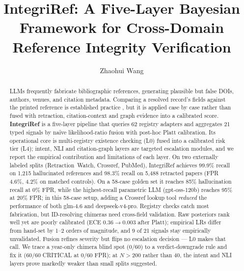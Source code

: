 \documentclass[runningheads]{llncs}
\begin{document}
\title{IntegriRef: A Five-Layer Bayesian Framework for Cross-Domain Reference Integrity Verification}

\author{Zhaohui Wang}

\maketitle

\begin{abstract}
LLMs frequently fabricate bibliographic references, generating plausible but false DOIs, authors, venues, and citation metadata. Comparing a resolved record's fields against the printed reference is established practice \cite{dunford2024bibliography}, but it is applied case by case rather than fused with retraction, citation-context and graph evidence into a calibrated score.
\textbf{IntegriRef} is a five-layer pipeline that queries 62 registry adapters and aggregates 21 typed signals by na\"ive likelihood-ratio fusion with post-hoc Platt calibration. Its operational core is multi-registry existence checking (L0) fused into a calibrated risk tier (L4); intent, NLI and citation-graph layers are targeted escalation modules, and we report the empirical contribution and limitations of each layer. On two externally labeled splits (Retraction~Watch, Crossref, PubMed), IntegriRef achieves 99.9\% recall on 1{,}215 hallucinated references and 98.3\% recall on 5{,}488 retracted papers (FPR 4.6\%, 4.2\% on matched controls). On a 58-case golden set it reaches 85\% hallucination recall at 0\% FPR, while the highest-recall parametric LLM (gpt-oss-120b) reaches 95\% at 20\% FPR; in this 58-case setup, adding a Crossref lookup tool \emph{reduced} the performance of both glm-4.6 and deepseek-v4-pro.
Registry checks catch most fabrication, but ID-resolving chimeras need cross-field validation. Raw posteriors rank well yet are poorly calibrated (ECE 0.36$\to$0.003 after Platt); empirical LRs differ from hand-set by 1--2 orders of magnitude, and 9 of 21 signals stay empirically unvalidated. Fusion refines severity but flips no escalation decision --- L0 makes that call. We trace a year-only chimera blind spot (0/60) to a verdict-downgrade rule and fix it (60/60 CRITICAL at 0/60 FPR); at $N{>}200$ rather than 40, the intent and NLI layers prove markedly weaker than small splits suggested.

\end{abstract}
\end{document}
